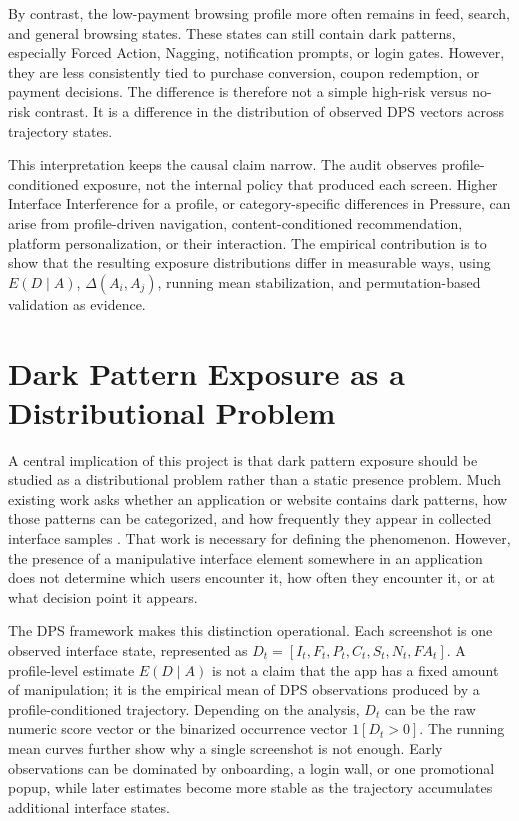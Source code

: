 By contrast, the low-payment browsing profile more often remains in feed, search, and general browsing states. These states can still contain dark patterns, especially Forced Action, Nagging, notification prompts, or login gates. However, they are less consistently tied to purchase conversion, coupon redemption, or payment decisions. The difference is therefore not a simple high-risk versus no-risk contrast. It is a difference in the distribution of observed DPS vectors across trajectory states.

This interpretation keeps the causal claim narrow. The audit observes profile-conditioned exposure, not the internal policy that produced each screen. Higher Interface Interference for a profile, or category-specific differences in Pressure, can arise from profile-driven navigation, content-conditioned recommendation, platform personalization, or their interaction. The empirical contribution is to show that the resulting exposure distributions differ in measurable ways, using \(E(D \mid A)\), \(\Delta(A_i,A_j)\), running mean stabilization, and permutation-based validation as evidence.

\section{Dark Pattern Exposure as a Distributional Problem}

A central implication of this project is that dark pattern exposure should be studied as a distributional problem rather than a static presence problem. Much existing work asks whether an application or website contains dark patterns, how those patterns can be categorized, and how frequently they appear in collected interface samples \cite{gray2018darkpatterns,mathur2019darkpatterns,mathur2021whatmakesdark}. That work is necessary for defining the phenomenon. However, the presence of a manipulative interface element somewhere in an application does not determine which users encounter it, how often they encounter it, or at what decision point it appears.

The DPS framework makes this distinction operational. Each screenshot is one observed interface state, represented as \(D_t=[I_t,F_t,P_t,C_t,S_t,N_t,FA_t]\). A profile-level estimate \(E(D \mid A)\) is not a claim that the app has a fixed amount of manipulation; it is the empirical mean of DPS observations produced by a profile-conditioned trajectory. Depending on the analysis, \(D_t\) can be the raw numeric score vector or the binarized occurrence vector \(1[D_t>0]\). The running mean curves further show why a single screenshot is not enough. Early observations can be dominated by onboarding, a login wall, or one promotional popup, while later estimates become more stable as the trajectory accumulates additional interface states.

